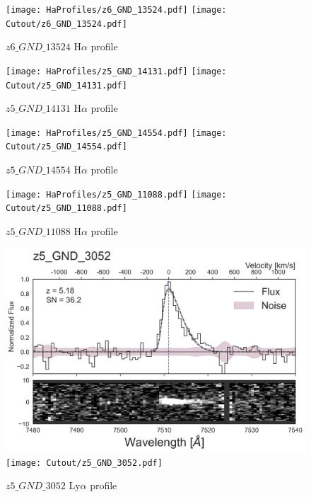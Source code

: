 \documentclass[12pt,english]{article}
\begin{document}
\clearpage
\begin{figure}
\begin{center}\texttt{[image: HaProfiles/z6\_GND\_13524.pdf]}
\texttt{[image: Cutout/z6\_GND\_13524.pdf]}
\caption{$z6\_GND\_13524$ H$\alpha$ profile}
\end{center}
\end{figure}
\clearpage
\begin{figure}
\begin{center}\texttt{[image: HaProfiles/z5\_GND\_14131.pdf]}
\texttt{[image: Cutout/z5\_GND\_14131.pdf]}
\caption{$z5\_GND\_14131$ H$\alpha$ profile}
\end{center}
\end{figure}
\clearpage
\begin{figure}
\begin{center}\texttt{[image: HaProfiles/z5\_GND\_14554.pdf]}
\texttt{[image: Cutout/z5\_GND\_14554.pdf]}
\caption{$z5\_GND\_14554$ H$\alpha$ profile}
\end{center}
\end{figure}
\clearpage
\begin{figure}
\begin{center}\texttt{[image: HaProfiles/z5\_GND\_11088.pdf]}
\texttt{[image: Cutout/z5\_GND\_11088.pdf]}
\caption{$z5\_GND\_11088$ H$\alpha$ profile}
\end{center}
\end{figure}
\clearpage
\begin{figure}
\begin{center}\includegraphics[width=12cm, trim=0.1cm 0cm 0cm -1cm]{LyaProfiles/z5_GND_3052.png}
\texttt{[image: Cutout/z5\_GND\_3052.pdf]}
\caption{$z5\_GND\_3052$ Ly$\alpha$ profile}
\end{center}
\end{figure}
\end{document}
